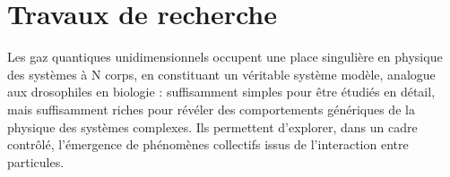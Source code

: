 



\section{Travaux de recherche}


Les gaz quantiques unidimensionnels occupent une place singulière en physique
des systèmes à N corps, en constituant un véritable système modèle, analogue
aux drosophiles en biologie : suffisamment simples pour être étudiés en détail,
mais suffisamment riches pour révéler des comportements génériques de la
physique des systèmes complexes. Ils permettent d’explorer, dans un cadre
contrôlé, l’émergence de phénomènes collectifs issus de l’interaction entre
particules.

